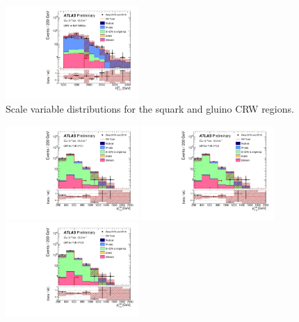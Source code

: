 \begin{figure}[tbp]
\begin{center}
\includegraphics[width=0.45\textwidth]{figures/ATLAS-CONF-2016-078_INT/N-1Plots/AtlasStyle/Preliminary/CRW_SRJigsawSRS3a_LastCut_CRW_minusone}
\end{center}
\caption{Scale variable distributions for the squark and gluino CRW regions.}
\label{fig:CRW_SRJigsawSRG1a_LastCut_CRW_minusone}
\end{figure}

\begin{figure}[tbp]
\begin{center}
\includegraphics[width=0.45\textwidth]{figures/ATLAS-CONF-2016-078_INT/N-1Plots/AtlasStyle/Preliminary/CRT_SRJigsawSRC1_LastCut_CRT_minusone}
\includegraphics[width=0.45\textwidth]{figures/ATLAS-CONF-2016-078_INT/N-1Plots/AtlasStyle/Preliminary/CRT_SRJigsawSRC2_LastCut_CRT_minusone}
\includegraphics[width=0.45\textwidth]{figures/ATLAS-CONF-2016-078_INT/N-1Plots/AtlasStyle/Preliminary/CRT_SRJigsawSRC3_LastCut_CRT_minusone}

\end{center}
\end{figure}
